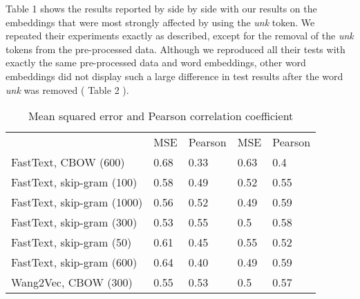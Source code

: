 \documentclass[12pt]{article}
\begin{document}
Table 1 shows the results reported by \cite{hartmann2017portuguese} side by side with our results on the embeddings that were most strongly affected by using the \textit{unk} token. We repeated their experiments exactly as described, except for the removal of the \textit{unk} tokens from the pre-processed data. Although we reproduced all their tests with exactly the same pre-processed data and word embeddings, other word embeddings did not display such a large difference in test results after the word \textit{unk} was removed ( Table 2 ).

\begin{table}[]
	\centering
	\caption{Mean squared error and Pearson correlation coefficient }
		\begin{tabular}{lllll}
		& MSE & Pearson & MSE & Pearson \\
		FastText, CBOW (600)       & 0.68              & 0.33                  & 0.63                 & 0.4                      \\
		FastText, skip-gram (100)  & 0.58              & 0.49                  & 0.52                 & 0.55                     \\
		FastText, skip-gram (1000) & 0.56              & 0.52                  & 0.49                 & 0.59                     \\
		FastText, skip-gram (300)  & 0.53              & 0.55                  & 0.5                  & 0.58                     \\
		FastText, skip-gram (50)   & 0.61              & 0.45                  & 0.55                 & 0.52                     \\
		FastText, skip-gram (600)  & 0.64              & 0.40                  & 0.49                 & 0.59                     \\
		Wang2Vec, CBOW (300)       & 0.55              & 0.53                  & 0.5                  & 0.57                    
	\end{tabular}
\end{table}
\end{document}
